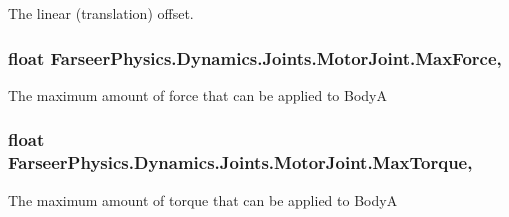 The linear (translation) offset. 

\hypertarget{class_farseer_physics_1_1_dynamics_1_1_joints_1_1_motor_joint_a3c925e1cf88a8d1c0a4df75c7e46af07}{
\subsubsection[{Max\+Force}]{\setlength{\rightskip}{0pt plus 5cm}float Farseer\+Physics.\+Dynamics.\+Joints.\+Motor\+Joint.\+Max\+Force\hspace{0.3cm}{\ttfamily [get]}, {\ttfamily [set]}}}\label{class_farseer_physics_1_1_dynamics_1_1_joints_1_1_motor_joint_a3c925e1cf88a8d1c0a4df75c7e46af07}


The maximum amount of force that can be applied to Body\+A 

\hypertarget{class_farseer_physics_1_1_dynamics_1_1_joints_1_1_motor_joint_adbc6b74b1ac276d1e1838e74101b9ecb}{
\subsubsection[{Max\+Torque}]{\setlength{\rightskip}{0pt plus 5cm}float Farseer\+Physics.\+Dynamics.\+Joints.\+Motor\+Joint.\+Max\+Torque\hspace{0.3cm}{\ttfamily [get]}, {\ttfamily [set]}}}\label{class_farseer_physics_1_1_dynamics_1_1_joints_1_1_motor_joint_adbc6b74b1ac276d1e1838e74101b9ecb}


The maximum amount of torque that can be applied to Body\+A 

